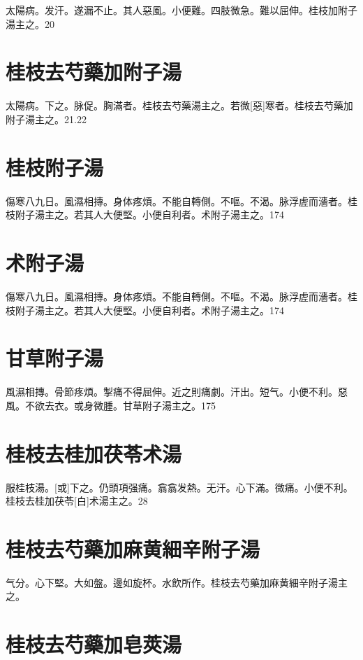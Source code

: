 \documentclass[12pt,twoside,UTF8,b5paper]{ctexbook}
\begin{document}
太陽病。发汗。遂漏不止。其人惡風。小便難。四肢微急。難以屈伸。桂枝加附子湯主之。20

\section{桂枝去芍藥加附子湯}

太陽病。下之。脉促。胸滿者。桂枝去芍藥湯主之。若微[惡]寒者。桂枝去芍藥加附子湯主之。21.22

\section{桂枝附子湯}

傷寒八九日。風濕相摶。身体疼煩。不能自轉側。不嘔。不渴。脉浮虗而濇者。桂枝附子湯主之。若其人大便堅。小便自利者。术附子湯主之。174

\section{术附子湯}

傷寒八九日。風濕相摶。身体疼煩。不能自轉側。不嘔。不渴。脉浮虗而濇者。桂枝附子湯主之。若其人大便堅。小便自利者。术附子湯主之。174

\section{甘草附子湯}

風濕相摶。骨節疼煩。掣痛不得屈伸。近之則痛劇。汗出。短气。小便不利。惡風。不欲去衣。或身微腫。甘草附子湯主之。175

\section{桂枝去桂加茯苓术湯}

服桂枝湯。[或]下之。仍頭項强痛。翕翕发熱。无汗。心下滿。微痛。小便不利。桂枝去桂加茯苓[白]术湯主之。28

\section{桂枝去芍藥加麻黄細辛附子湯}

气分。心下堅。大如盤。邊如旋杯。水飲所作。桂枝去芍藥加麻黄細辛附子湯主之。

\section{桂枝去芍藥加皂莢湯}
\end{document}
